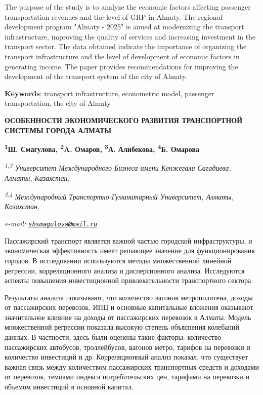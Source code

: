 The purpose of the study is to analyze the economic factors affecting
passenger transportation revenues and the level of GRP in Almaty. The
regional development program "Almaty - 2025" is aimed at modernizing the
transport infrastructure, improving the quality of services and
increasing investment in the transport sector. The data obtained
indicate the importance of organizing the transport infrastructure and
the level of development of economic factors in generating income. The
paper provides recommendations for improving the development of the
transport system of the city of Almaty.

{\bfseries Keywords}: transport infrastructure, econometric model,
passenger transportation, the city of Almaty

{\bfseries ОСОБЕННОСТИ ЭКОНОМИЧЕСКОГО РАЗВИТИЯ ТРАНСПОРТНОЙ СИСТЕМЫ ГОРОДА
АЛМАТЫ}

{\bfseries \textsuperscript{1}Ш. Смагулова\textsuperscript{\envelope },
\textsuperscript{2}A. Омаров, \textsuperscript{3}А. Алибекова,
\textsuperscript{4}Б. Омарова}

\emph{\textsuperscript{1,3} Университет Международного Бизнеса имени
Кенжегали Сагадиева, Алматы, Казахстан,}

\emph{\textsuperscript{2,4} Международный Транспортно-Гуманитарный
Университет, Алматы, Казахстан,}

\emph{e-mail:
\href{mailto:shsmagulova@mail.ru}{\nolinkurl{shsmagulova@mail.ru}}}

Пассажирский транспорт является важной частью городской инфраструктуры,
и экономическая эффективность имеет решающее значение для
функционирования городов. В исследовании используются методы
множественной линейной регрессии, корреляционного анализа и
дисперсионного анализа. Исследуются аспекты повышения инвестиционной
привлекательности транспортного сектора.

Результаты анализа показывают, что количество вагонов метрополитена,
доходы от пассажирских перевозок, ИПЦ и основные капитальные вложения
оказывают значительное влияние на доходы от пассажирских перевозок в
Алматы. Модель множественной регрессии показала высокую степень
объяснения колебаний данных. В частности, здесь были оценены такие
факторы: количество пассажирских автобусов, троллейбусов, вагонов метро,
тарифов на перевозки и количество инвестиций и др. Корреляционный анализ
показал, что существует важная связь между количеством пассажирских
транспортных средств и доходами от перевозок, темпами индекса
потребительских цен, тарифами на перевозки и объемом инвестиций в
основной капитал.

